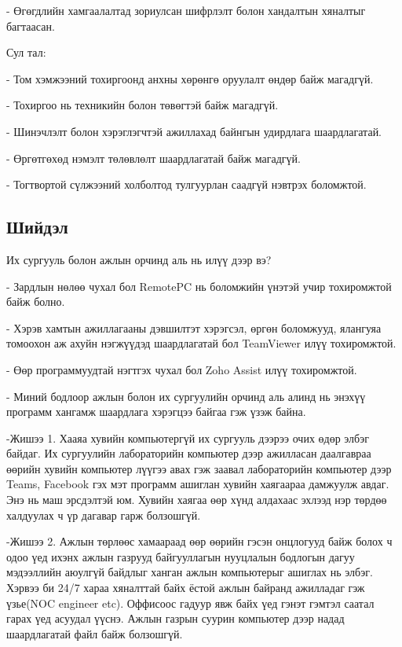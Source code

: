 - Өгөгдлийн хамгаалалтад зориулсан шифрлэлт болон хандалтын хяналтыг багтаасан.

Сул тал:

- Том хэмжээний тохиргоонд анхны хөрөнгө оруулалт өндөр байж магадгүй.

- Тохиргоо нь техникийн болон төвөгтэй байж магадгүй.

- Шинэчлэлт болон хэрэглэгчтэй ажиллахад байнгын удирдлага шаардлагатай.

- Өргөтгөхөд нэмэлт төлөвлөлт шаардлагатай байж магадгүй.

- Тогтвортой сүлжээний холболтод тулгуурлан саадгүй нэвтрэх боломжтой.
	\pagebreak	

\subsection{Шийдэл}
	\quad \quad 
	Их сургууль болон ажлын орчинд аль нь илүү дээр вэ?

- Зардлын нөлөө чухал бол RemotePC нь боломжийн үнэтэй учир тохиромжтой байж болно.

- Хэрэв хамтын ажиллагааны дэвшилтэт хэрэгсэл, өргөн боломжууд, ялангуяа томоохон аж ахуйн нэгжүүдэд шаардлагатай бол TeamViewer илүү тохиромжтой.

- Өөр программуудтай нэгтгэх чухал бол Zoho Assist илүү тохиромжтой.

- Миний бодлоор ажлын болон их сургуулийн орчинд аль алинд нь энэхүү программ хангамж шаардлага хэрэгцээ байгаа гэж үзэж байна.

-Жишээ 1. Хааяа хувийн компьютергүй их сургууль дээрээ очих өдөр элбэг байдаг. Их сургуулийн лабораторийн компьютер дээр ажилласан даалгавраа өөрийн хувийн компьютер лүүгээ авах гэж заавал лабораторийн компьютер дээр Teams, Facebook гэх мэт программ ашиглан хувийн хаягаараа дамжуулж авдаг. Энэ нь маш эрсдэлтэй юм. Хувийн хаягаа өөр хүнд алдахаас эхлээд нэр төрдөө халдуулах ч үр дагавар гарж болзошгүй.

-Жишээ 2. Ажлын төрлөөс хамаараад өөр өөрийн гэсэн онцлогууд байж болох ч одоо үед ихэнх ажлын газрууд байгууллагын нууцлалын бодлогын дагуу мэдээллийн аюулгүй байдлыг ханган ажлын компьютерыг ашиглах нь элбэг. Хэрвээ би 24/7 хараа хяналттай байх ёстой ажлын байранд ажилладаг гэж үзье(NOC engineer etc). Оффисоос гадуур явж байх үед гэнэт гэмтэл саатал гарах үед асуудал үүснэ. Ажлын газрын суурин компьютер дээр надад шаардлагатай файл байж болзошгүй.
	\pagebreak	   